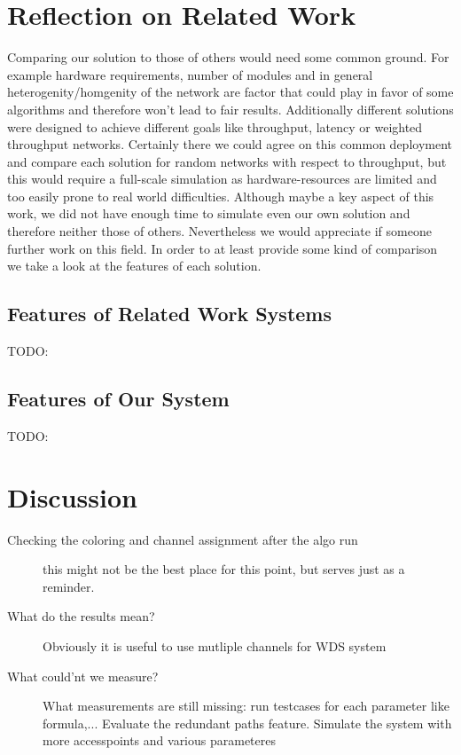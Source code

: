\section{Reflection on Related Work}
  Comparing our solution to those of others would need some common ground. For example hardware requirements, number of modules and in general heterogenity/homgenity of
  the network are factor that could play in favor of some algorithms and therefore won't lead to fair results. Additionally different solutions were designed to 
  achieve different goals like throughput, latency or weighted throughput networks. Certainly there we could agree on this common deployment and compare each solution for random
  networks with respect to throughput, but this would require a full-scale simulation as hardware-resources are limited and too easily prone to real world difficulties.
  Although maybe a key aspect of this work, we did not have enough time to simulate even our own solution and therefore neither those of others. Nevertheless we would appreciate
  if someone further work on this field. In order to at least provide some kind of comparison we take a look at the features of each solution.
  \subsection{Features of Related Work Systems}
    TODO:
  \subsection{Features of Our System}
    TODO:
    
\section{Discussion}
  \begin{description}
   \item [Checking the coloring and channel assignment after the algo run]
   this might not be the best place for this point, but serves just as a reminder.
   \item [What do the results mean?]
   Obviously it is useful to use mutliple channels for WDS system
   \item[What could'nt we measure?]
   What measurements are still missing:  run testcases for each parameter like formula,...
   Evaluate the redundant paths feature.
   Simulate the system with more accesspoints and various parameteres
  \end{description}
